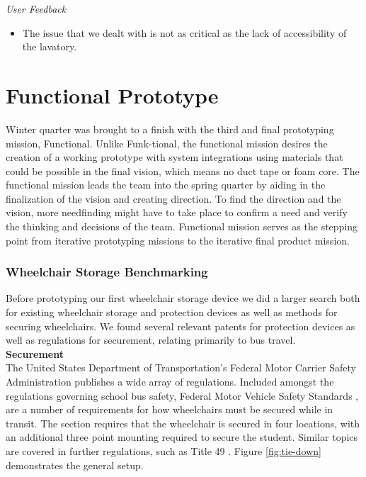 \emph{User Feedback}
\begin{itemize}
	\item The issue that we dealt with is not as critical as the lack of accessibility of the lavatory.
\end{itemize}


\section{Functional Prototype}
Winter quarter was brought to a finish with the third and final prototyping mission, Functional.  Unlike Funk-tional, the functional mission desires the creation of a working prototype with system integrations using materials that could be possible in the final vision, which means no duct tape or foam core. The functional mission leads the team into the spring quarter by aiding in the finalization of the vision and creating direction.  To find the direction and the vision, more needfinding might have to take place to confirm a need and verify the thinking and decisions of the team. Functional mission serves as the stepping point from iterative prototyping missions to the iterative final product mission.

\subsubsection{Wheelchair Storage Benchmarking}
Before prototyping our first wheelchair storage device we did a larger search both for existing wheelchair storage and protection devices as well as methods for securing wheelchairs. We found several relevant patents for protection devices as well as regulations for securement, relating primarily to bus travel. \\

\noindent\textbf{Securement}\\
The United States Department of Transportation's Federal Motor Carrier Safety Administration publishes a wide array of regulations. Included amongst the regulations governing school bus safety, Federal Motor Vehicle Safety Standards  \cite{fmvs222}, are a number of requirements for how wheelchairs must be secured while in transit. The section requires that the wheelchair is secured in four locations, with an additional three point mounting required to secure the student. Similar topics are covered in further regulations, such as Title 49  \cite{ecfr}. Figure \ref{fig:tie-down} demonstrates the general setup. 


